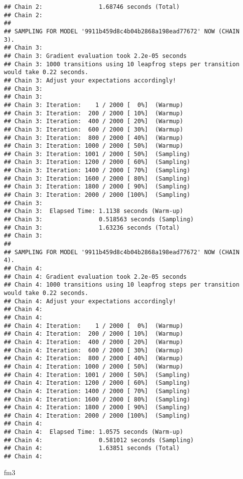 \documentclass[
]{book}
\newenvironment{Shaded}{\begin{snugshade}}{\end{snugshade}}
\newcommand{\NormalTok}[1]{#1}
\begin{document}
\begin{verbatim}
## Chain 2:                1.68746 seconds (Total)
## Chain 2: 
## 
## SAMPLING FOR MODEL '9911b459d8c4b04b2868a198ead77672' NOW (CHAIN 3).
## Chain 3: 
## Chain 3: Gradient evaluation took 2.2e-05 seconds
## Chain 3: 1000 transitions using 10 leapfrog steps per transition would take 0.22 seconds.
## Chain 3: Adjust your expectations accordingly!
## Chain 3: 
## Chain 3: 
## Chain 3: Iteration:    1 / 2000 [  0%]  (Warmup)
## Chain 3: Iteration:  200 / 2000 [ 10%]  (Warmup)
## Chain 3: Iteration:  400 / 2000 [ 20%]  (Warmup)
## Chain 3: Iteration:  600 / 2000 [ 30%]  (Warmup)
## Chain 3: Iteration:  800 / 2000 [ 40%]  (Warmup)
## Chain 3: Iteration: 1000 / 2000 [ 50%]  (Warmup)
## Chain 3: Iteration: 1001 / 2000 [ 50%]  (Sampling)
## Chain 3: Iteration: 1200 / 2000 [ 60%]  (Sampling)
## Chain 3: Iteration: 1400 / 2000 [ 70%]  (Sampling)
## Chain 3: Iteration: 1600 / 2000 [ 80%]  (Sampling)
## Chain 3: Iteration: 1800 / 2000 [ 90%]  (Sampling)
## Chain 3: Iteration: 2000 / 2000 [100%]  (Sampling)
## Chain 3: 
## Chain 3:  Elapsed Time: 1.1138 seconds (Warm-up)
## Chain 3:                0.518563 seconds (Sampling)
## Chain 3:                1.63236 seconds (Total)
## Chain 3: 
## 
## SAMPLING FOR MODEL '9911b459d8c4b04b2868a198ead77672' NOW (CHAIN 4).
## Chain 4: 
## Chain 4: Gradient evaluation took 2.2e-05 seconds
## Chain 4: 1000 transitions using 10 leapfrog steps per transition would take 0.22 seconds.
## Chain 4: Adjust your expectations accordingly!
## Chain 4: 
## Chain 4: 
## Chain 4: Iteration:    1 / 2000 [  0%]  (Warmup)
## Chain 4: Iteration:  200 / 2000 [ 10%]  (Warmup)
## Chain 4: Iteration:  400 / 2000 [ 20%]  (Warmup)
## Chain 4: Iteration:  600 / 2000 [ 30%]  (Warmup)
## Chain 4: Iteration:  800 / 2000 [ 40%]  (Warmup)
## Chain 4: Iteration: 1000 / 2000 [ 50%]  (Warmup)
## Chain 4: Iteration: 1001 / 2000 [ 50%]  (Sampling)
## Chain 4: Iteration: 1200 / 2000 [ 60%]  (Sampling)
## Chain 4: Iteration: 1400 / 2000 [ 70%]  (Sampling)
## Chain 4: Iteration: 1600 / 2000 [ 80%]  (Sampling)
## Chain 4: Iteration: 1800 / 2000 [ 90%]  (Sampling)
## Chain 4: Iteration: 2000 / 2000 [100%]  (Sampling)
## Chain 4: 
## Chain 4:  Elapsed Time: 1.0575 seconds (Warm-up)
## Chain 4:                0.581012 seconds (Sampling)
## Chain 4:                1.63851 seconds (Total)
## Chain 4:
\end{verbatim}

\begin{Shaded}
\begin{Highlighting}[]
\NormalTok{fm3}
\end{Highlighting}
\end{Shaded}
\end{document}
